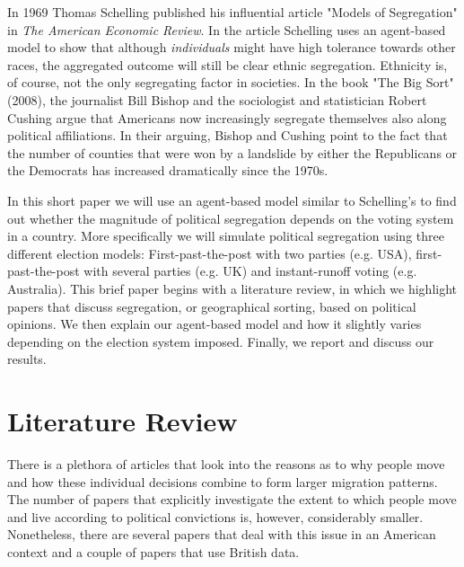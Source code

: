 \documentclass[12pt, a4paper]{article}
\begin{document}
	In 1969 Thomas Schelling published his influential article "Models of Segregation" in \textit{The American Economic Review}. In the article Schelling uses an agent-based model to show that although \textit{individuals} might have high tolerance towards other races, the aggregated outcome will still be clear ethnic segregation. Ethnicity is, of course, not the only segregating factor in societies. In the book "The Big Sort" (2008), the journalist Bill Bishop and the sociologist and statistician Robert Cushing argue that Americans now increasingly segregate themselves also along political affiliations. In their arguing, Bishop and Cushing point to the fact that the number of counties that were won by a landslide by either the Republicans or the Democrats has increased dramatically since the 1970s. 
	
	In this short paper we will use an agent-based model similar to Schelling's to find out whether the magnitude of political segregation depends on the voting system in a country. More specifically we will simulate political segregation using three different election models: First-past-the-post with two parties (e.g. USA), first-past-the-post with several parties (e.g. UK) and instant-runoff voting (e.g. Australia). This brief paper begins with a literature review, in which we highlight papers that discuss segregation, or geographical sorting, based on political opinions. We then explain our agent-based model and how it slightly varies depending on the election system imposed. Finally, we report and discuss our results.
	
	
	\section{Literature Review}\label{lit}
	There is a plethora of articles that look into the reasons as to why people move and how these individual decisions combine to form larger migration patterns. The number of papers that explicitly investigate the extent to which people move and live according to political convictions is, however, considerably smaller. Nonetheless, there are several papers that deal with this issue in an American context and a couple of papers that use British data. 
	
\end{document}

